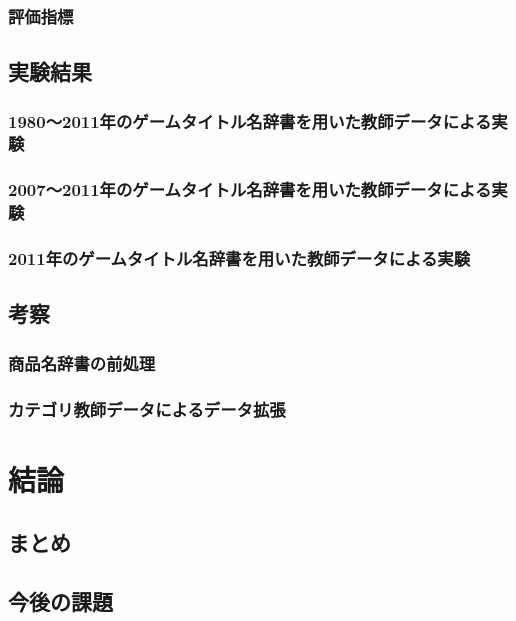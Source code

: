 \documentclass[a4paper,11pt]{jreport}
\begin{document}
\subsection{評価指標}

\section{実験結果}

\subsection{1980〜2011年のゲームタイトル名辞書を用いた教師データによる実験}


\subsection{2007〜2011年のゲームタイトル名辞書を用いた教師データによる実験}

\subsection{2011年のゲームタイトル名辞書を用いた教師データによる実験}



\section{考察}

\subsection{商品名辞書の前処理}


\subsection{カテゴリ教師データによるデータ拡張}



\chapter{結論}
\section{まとめ}

\section{今後の課題}
\end{document}
